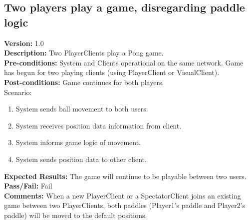 \documentclass[12pt]{article}
\begin{document}
    \subsection{Two players play a game, disregarding paddle logic}
    \label{sec:gameNoLogic}
    \textbf{Version:} 1.0\\
    \textbf{Description:} Two PlayerClients play a Pong game.\\
    \textbf{Pre-conditions:} System and Clients operational on the same network.  Game has begun for two playing clients (using PlayerClient or VisualClient).\\
    \textbf{Post-conditions:} Game continues for both players.\\
    Scenario:
    \begin{enumerate}
        \item System sends ball movement to both users.
        \item System receives position data information from client.
        \item System informs game logic of movement.
        \item System sends position data to other client.
    \end{enumerate}
    \textbf{Expected Results:} The game will continue to be playable between two users.\\
    \textbf{Pass/Fail:} Fail\\
    \textbf{Comments:} When a new PlayerClient or a SpectatorClient joins an existing game between two PlayerClients, both paddles (Player1’s paddle and Player2’s paddle) will be moved to the default positions.\\
\end{document}
